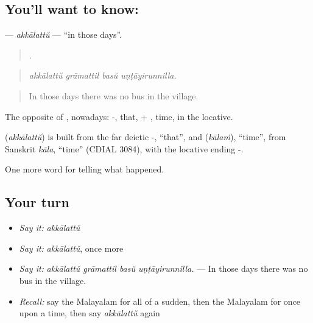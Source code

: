 \subsection*{You'll want to know: }
\textbf{} — \emph{akkālattŭ} — \textquotedblleft{}in those days\textquotedblright{}.

\begin{quote}
   .
\end{quote}

\begin{quote}
\emph{akkālattŭ grāmattil basŭ uṇṭāyirunnilla.}
\end{quote}

\begin{quote}
In those days there was no bus in the village.
\end{quote}

The opposite of , nowadays: -, that, + , time, in the locative.

\begin{cousinweb}
\textbf{} (\emph{akkālattŭ}) is built from the far deictic -, \textquotedblleft{}that\textquotedblright{}, and  (\emph{kālaṁ}), \textquotedblleft{}time\textquotedblright{}, from Sanskrit \emph{kāla}, \textquotedblleft{}time\textquotedblright{} (CDIAL 3084), with the locative ending -.
\end{cousinweb}

\begin{grammarlens}[title={What you've built}]
One more word for telling what happened.
\end{grammarlens}

\subsection*{Your turn}
\begin{itemize}
\raggedright
  \item \emph{Say it:} \emph{akkālattŭ}
  \item \emph{Say it:} \emph{akkālattŭ}, once more
  \item \emph{Say it:} \emph{akkālattŭ grāmattil basŭ uṇṭāyirunnilla.} — In those days there was no bus in the village.
  \item \emph{Recall:} say the Malayalam for all of a sudden, then the Malayalam for once upon a time, then say \emph{akkālattŭ} again
\end{itemize}

